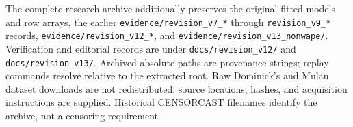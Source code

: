 \documentclass{article}
\begin{document}
The complete research archive additionally preserves the original fitted models and row arrays, the earlier \texttt{evidence/revision\_v7\_*} through \texttt{revision\_v9\_*} records, \texttt{evidence/revision\_v12\_*}, and \texttt{evidence/revision\_v13\_nonwape/}. Verification and editorial records are under \texttt{docs/revision\_v12/} and \texttt{docs/revision\_v13/}. Archived absolute paths are provenance strings; replay commands resolve relative to the extracted root. Raw Dominick's and Mulan dataset downloads are not redistributed; source locations, hashes, and acquisition instructions are supplied. Historical CENSORCAST filenames identify the archive, not a censoring requirement.



\appendix
\renewcommand{\topfraction}{0.9}
\renewcommand{\bottomfraction}{0.9}
\renewcommand{\textfraction}{0.08}
\renewcommand{\floatpagefraction}{0.85}
\setcounter{topnumber}{4}
\setcounter{totalnumber}{5}











\FloatBarrier

\end{document}
